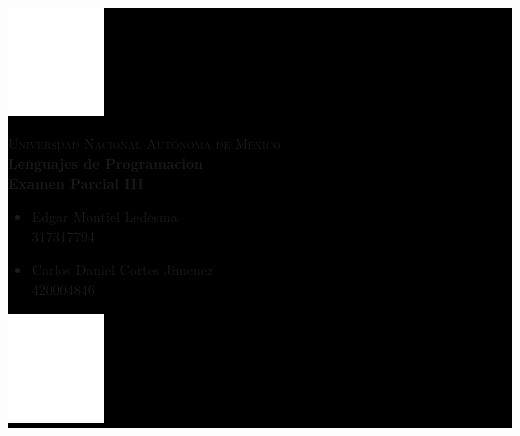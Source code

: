 \documentclass{article}
\begin{document}
\pagecolor{black}
\color{white}

    \colorbox{black}{
        \begin{minipage}[t]{0.16 \textwidth}
           \begin{flushright}
            \includegraphics[width=1in]{UNAM.png}
           \end{flushright}
        \end{minipage}
        \begin{minipage}[H]{0.62 \textwidth}
            \begin{center}
                {\large \textsc{Universdad Nacional Autónoma de México}}
                \vspace{0.25cm}
                \\
                { \large \textbf{Lenguajes de Programacion\\ Examen Parcial III}}                
                \textbf{}
                \begin{multicols}{2}
                \begin{flushleft}
                \begin{itemize}
                    \item  \small Edgar Montiel Ledesma\\ 317317794
    
                    \item \footnotesize Carlos Daniel Cortes Jimenez\\ 420004846
                \end{itemize}
                \end{flushleft}
                \vspace{0.25cm}
                \end{multicols} 
            \end{center}
            \vspace{0.05cm}
        \end{minipage}
        \begin{minipage}[t]{0.16 \textwidth}
            \begin{flushleft}
                \includegraphics[width=1in]{EFC.png}
            \end{flushleft}
        \end{minipage}
    }
    
\end{document}

